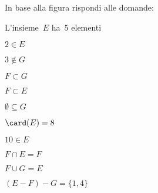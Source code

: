\begin{multicols}{2}
\begin{esercizio}
\label{ese:7.64}
In base alla figura rispondi alle domande:
\TabPositions{4.5cm}
\begin{enumeratea}
\item L'insieme~\(E\) ha~5 elementi \tab\boxV\quad\boxF
\item \(2\in E\) \tab\boxV\quad\boxF
\item \(3\notin G\) \tab\boxV\quad\boxF
\item \(F\subset G\) \tab\boxV\quad\boxF
\item \(F\subset E\) \tab\boxV\quad\boxF
\item \(\emptyset \subseteq G\) \tab\boxV\quad\boxF
\item \(\card(E)=8\) \tab\boxV\quad\boxF
\item \(10\in E\) \tab\boxV\quad\boxF
\item \(F\cap E=F\) \tab\boxV\quad\boxF
\item \(F\cup G=E\) \tab\boxV\quad\boxF
\item \((E-F)-G=\{1,4\}\) \tab\boxV\quad\boxF
\end{enumeratea}
\begin{center}
 
\end{center}
\end{esercizio}

\end{multicols}

